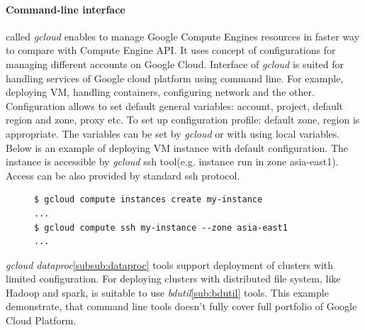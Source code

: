 \documentclass[a4paper,12pt,oneside]{report}
\begin{document}
\paragraph{Command-line interface} called \textit{gcloud} enables to manage Google Compute Engines resources in faster way 
to compare with Compute Engine API. It uses concept of configurations for managing different accounts on Google Cloud. 
Interface of \textit{gcloud} is suited for handling services of Google cloud platform using command line. For example, 
deploying VM, handling containers, configuring network and the other.
Configuration allows to set default general variables: account, project, default region 
and zone, proxy etc. To set up configuration profile: default zone, region is appropriate. 
The variables can be set by \textit{gcloud} or with using 
local variables.
Below is an example of deploying VM instance with default configuration. The instance 
is accessible by \textit{gcloud} ssh tool(e.g. instance run in zone asia-east1). Access can be also provided 
by standard ssh protocol.
\begin{figure}[!htbp]
\lstset{extendedchars=false,escapeinside=''}
\begin{lstlisting}[style=mybash]
$ gcloud compute instances create my-instance
...
$ gcloud compute ssh my-instance --zone asia-east1
...
\end{lstlisting} \end{figure}

\textit{gcloud dataproc}\ref{subsub:dataproc} tools support deployment of clusters with limited configuration. For deploying 
clusters with distributed file system, like Hadoop and spark, is suitable to use \textit{bdutil}\ref{sub:bdutil} tools. 
This example demonstrate, that command line tools doesn’t fully cover full portfolio of Google Cloud Platform. 
   
\end{document}
